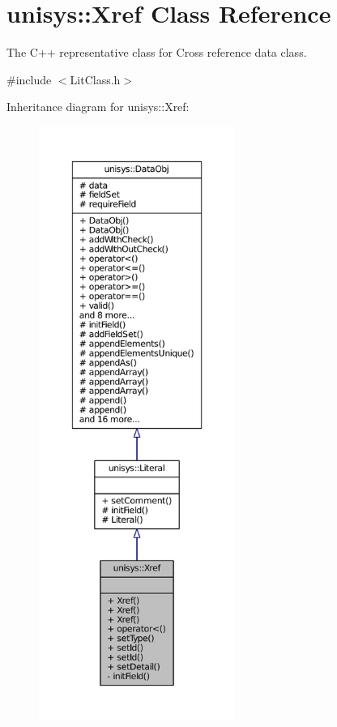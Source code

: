 \hypertarget{classunisys_1_1Xref}{\section{unisys\-:\-:Xref Class Reference}
\label{classunisys_1_1Xref}
}


The C++ representative class for Cross reference data class.  




{\ttfamily \#include $<$Lit\-Class.\-h$>$}



Inheritance diagram for unisys\-:\-:Xref\-:
\nopagebreak
\begin{figure}[H]
\begin{center}
\leavevmode
\includegraphics[height=550pt]{classunisys_1_1Xref__inherit__graph}
\end{center}
\end{figure}


